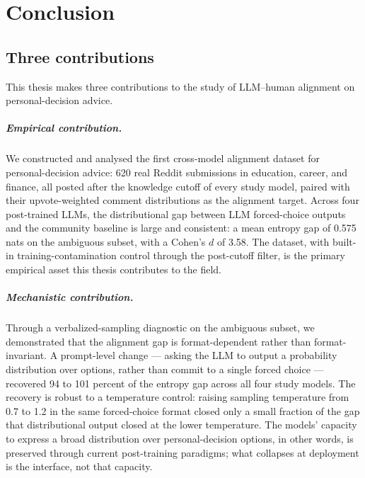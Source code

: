 \chapter{Conclusion}
\label{chap:conclusion}

\section{Three contributions}
\label{sec:conc_contributions}

This thesis makes three contributions to the study of LLM--human
alignment on personal-decision advice.

\paragraph{Empirical contribution.}
We constructed and analysed the first cross-model alignment dataset
for personal-decision advice: 620 real Reddit submissions in
education, career, and finance, all posted after the knowledge cutoff
of every study model, paired with their upvote-weighted comment
distributions as the alignment target. Across four post-trained LLMs,
the distributional gap between LLM forced-choice outputs and the
community baseline is large and consistent: a mean entropy gap of
0.575 nats on the ambiguous subset, with a Cohen's $d$ of 3.58. The
dataset, with built-in training-contamination control through the
post-cutoff filter, is the primary empirical asset this thesis
contributes to the field.

\paragraph{Mechanistic contribution.}
Through a verbalized-sampling diagnostic on the ambiguous subset, we
demonstrated that the alignment gap is format-dependent rather than
format-invariant. A prompt-level change --- asking the LLM to output a
probability distribution over options, rather than commit to a single
forced choice --- recovered 94 to 101 percent of the entropy gap
across all four study models. The recovery is robust to a temperature
control: raising sampling temperature from 0.7 to 1.2 in the same
forced-choice format closed only a small fraction of the gap that
distributional output closed at the lower temperature. The models'
capacity to express a broad distribution over personal-decision options,
in other words, is preserved through current post-training paradigms;
what collapses at deployment is the interface, not that capacity.

